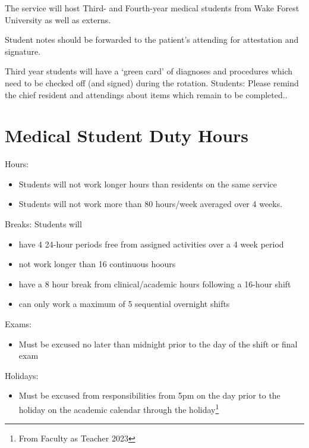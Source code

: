 \documentclass[
  letterpaper,
]{scrbook}
\providecommand{\tightlist}{%
  \setlength{\itemsep}{0pt}\setlength{\parskip}{0pt}}
\begin{document}
The service will host Third- and Fourth-year medical students from Wake
Forest University as well as externs.

Student notes should be forwarded to the patient's attending for
attestation and signature.

Third year students will have a `green card' of diagnoses and procedures
which need to be checked off (and signed) during the rotation. Students:
Please remind the chief resident and attendings about items which remain
to be completed..

\section{Medical Student Duty Hours}\label{medical-student-duty-hours}

Hours:

\begin{itemize}
\tightlist
\item
  Students will not work longer hours than residents on the same service
\item
  Students will not work more than 80 hours/week averaged over 4 weeks.
\end{itemize}

Breaks: Students will

\begin{itemize}
\tightlist
\item
  have 4 24-hour periods free from assigned activities over a 4 week
  period
\item
  not work longer than 16 continuous hoours
\item
  have a 8 hour break from clinical/academic hours following a 16-hour
  shift
\item
  can only work a maximum of 5 sequential overnight shifts
\end{itemize}

Exams:

\begin{itemize}
\tightlist
\item
  Must be excused no later than midnight prior to the day of the shift
  or final exam
\end{itemize}

Holidays:

\begin{itemize}
\tightlist
\item
  Must be excused from responsibilities from 5pm on the day prior to the
  holiday on the academic calendar through the holiday\footnote{From
    Faculty as Teacher 2023}
\end{itemize}
\end{document}
